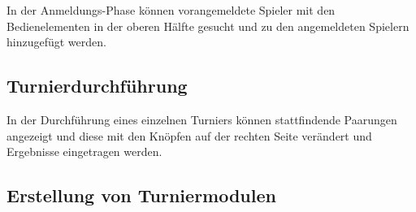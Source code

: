 \documentclass[11pt]{article}
\begin{document}
\vspace{1cm}

In der Anmeldungs-Phase können vorangemeldete Spieler mit den Bedienelementen in der oberen Hälfte gesucht und zu den angemeldeten Spielern hinzugefügt werden.

\subsection{Turnierdurchführung}


\vspace{1cm}

In der Durchführung eines einzelnen Turniers können stattfindende Paarungen angezeigt und diese mit den Knöpfen auf der rechten Seite verändert und Ergebnisse eingetragen werden.

\subsection{Erstellung von Turniermodulen}

\end{document}
